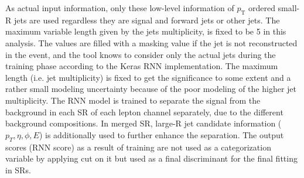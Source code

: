 As actual input information, only these low-level information of $p_\mathrm{T}$ ordered small-R jets are used regardless they are signal and forward jets or other jets. 
The maximum variable length given by the jets multiplicity, is fixed to be 5 in this analysis. 
The values are filled with a masking value if the jet is not reconstructed in the event, and the tool knows to consider only the actual jets during the training phase according to the Keras RNN implementation. 
The maximum length (i.e. jet multiplicity) is fixed to get the significance to some extent and a rather small modeling uncertainty because of the poor modeling of the higher jet multiplicity.
The RNN model is trained to separate the signal from the background in each SR of each lepton channel separately, due to the different background compositions. 
In merged SR, large-R jet candidate information ($p_T, \eta, \phi, E$) is additionally used to further enhance the separation.
The output scores (RNN score) as a result of training are not used as a categorization variable by applying cut on it but used as a final discriminant for the final fitting in SRs. 
